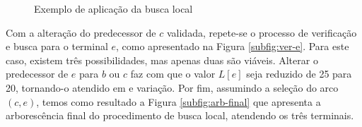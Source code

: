 \begin{figure}[!ht]
\begin{subfigure}{.3\textwidth}
\end{subfigure}
\caption{Exemplo de aplicação da busca local \label{fig:exemplo-busca}}
\end{figure}

Com  a  alteração do  predecessor  de  $c$  validada,  repete-se o  processo  de
verificação  e   busca  para  o   terminal  $e$,  como  apresentado   na  Figura
\ref{subfig:ver-e}. Para este caso, existem três possibilidades, mas apenas duas
são viáveis. Alterar  o predecessor de $e$ para  $b$ ou $c$ faz com  que o valor
$L[e]$ seja reduzido de 25 para  20, tornando-o atendido em {\delay} e variação.
Por fim,  assumindo a seleção  do arco $(c, e)$,  temos como resultado  a Figura
\ref{subfig:arb-final} que  apresenta a  arborescência final do  procedimento de
busca local, atendendo os três terminais.

